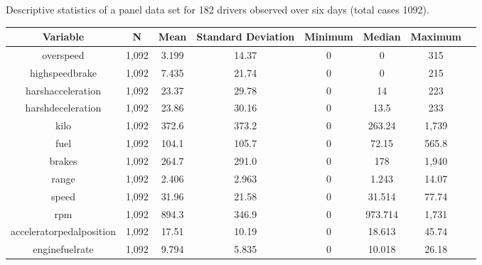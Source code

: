 \documentclass[entropy,article,submit,moreauthors,LaTeX and dvi2pdf]{Definitions/mdpi}
\begin{document}
\begin{specialtable}[htbp]
\widetable
\caption{Descriptive statistics of a panel data set for 182 drivers observed over six days (total cases 1092).}
\label{panel}
\begin{tabular}{cccccccc}
\toprule
Variable               & N     & Mean  & Standard Deviation & Minimum & Median & Maximum \\
\midrule
overspeed                & 1,092 & 3.199 & 14.37              & 0   &0    & 315     \\
highspeedbrake           & 1,092 & 7.435 & 21.74              & 0   &0    & 215     \\
harshacceleration        & 1,092 & 23.37 & 29.78              & 0   &14    & 223     \\
harshdeceleration        & 1,092 & 23.86 & 30.16              & 0   &13.5    & 233     \\
kilo                     & 1,092 & 372.6 & 373.2              & 0   &263.24    & 1,739   \\
fuel                     & 1,092 & 104.1 & 105.7              & 0   &72.15    & 565.8   \\
brakes                   & 1,092 & 264.7 & 291.0              & 0   &178    & 1,940   \\
range                    & 1,092 & 2.406 & 2.963              & 0   &1.243    & 14.07   \\
speed                    & 1,092 & 31.96 & 21.58              & 0   &31.514    & 77.74   \\
rpm                      & 1,092 & 894.3 & 346.9              & 0   &973.714    & 1,731   \\
acceleratorpedalposition & 1,092 & 17.51 & 10.19              & 0   &18.613    & 45.74   \\
enginefuelrate           & 1,092 & 9.794 & 5.835              & 0   &10.018    & 26.18   \\
\bottomrule
\end{tabular}
\end{specialtable}
\end{document}
